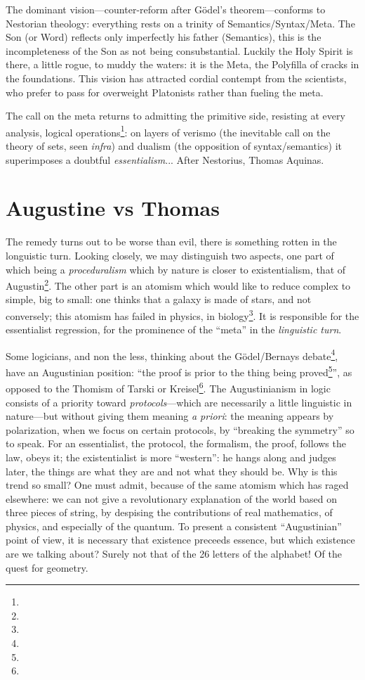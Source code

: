 \documentclass{article}
\begin{document}
The dominant vision---counter-reform after Gödel's theorem---conforms to Nestorian theology: everything rests on a trinity of Semantics/Syntax/Meta. The Son (or Word) reflects only imperfectly his father (Semantics), this is the incompleteness of the Son as not being consubstantial. Luckily the Holy Spirit is there, a little rogue, to muddy the waters: it is the Meta, the Polyfilla of cracks in the foundations. This vision has attracted cordial contempt from the scientists, who prefer to pass for overweight Platonists rather than fueling the meta.

The call on the meta returns to admitting the primitive side, resisting at every analysis, logical operations\footnote{}: on layers of verismo (the inevitable call on the theory of sets, seen \emph{infra}) and dualism (the opposition of syntax/semantics) it superimposes a doubtful \emph{essentialism}... After Nestorius, Thomas Aquinas.

\section{Augustine vs Thomas}
The remedy turns out to be worse than evil, there is something rotten in the longuistic turn. Looking closely, we may distinguish two aspects, one part of which being a \emph{proceduralism} which by nature is closer to existentialism, that of Augustin\footnote{}. The other part is an atomism which would like to reduce complex to simple, big to small: one thinks that a galaxy is made of stars, and not conversely; this atomism has failed in physics, in biology\footnote{}. It is responsible for the essentialist regression, for the prominence of the \enquote{meta} in the \emph{linguistic turn}.

Some logicians, and non the less, thinking about the Gödel/Bernays debate\footnote{}, have an Augustinian position: \enquote{the proof is prior to the thing being proved\footnote{}}, as opposed to the Thomism of Tarski or Kreisel\footnote{}. The Augustinianism in logic consists of a priority toward \emph{protocols}---which are necessarily a little linguistic in nature---but without giving them meaning \emph{a priori}: the meaning appears by polarization, when we focus on certain protocols, by \enquote{breaking the symmetry} so to speak. For an essentialist, the protocol, the formalism, the proof, follows the law, obeys it; the existentialist is more \enquote{western}: he hangs along and judges later, the things are what they are and not what they should be. Why is this trend so small? One must admit, because of the same atomism which has raged elsewhere: we can not give a revolutionary explanation of the world based on three pieces of string, by despising the contributions of real mathematics, of physics, and especially of the quantum. To present a consistent \enquote{Augustinian} point of view, it is necessary that existence preceeds essence, but which existence are we talking about? Surely not that of the 26 letters of the alphabet! Of the quest for geometry.
\end{document}
